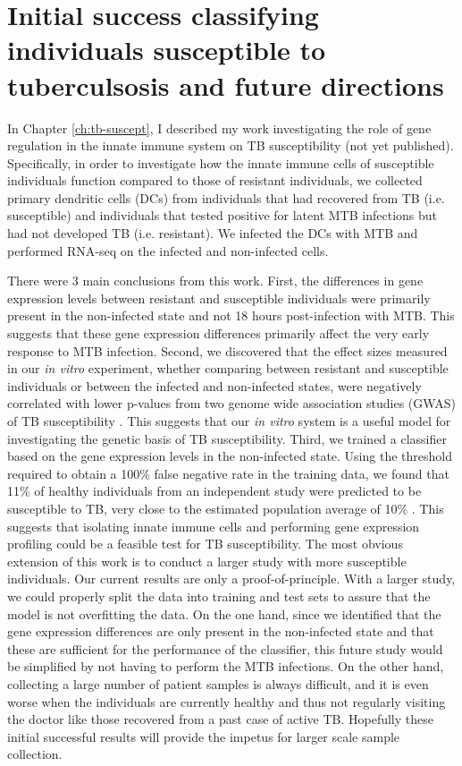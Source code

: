 \section{Initial success classifying individuals susceptible to tuberculsosis and future directions}

In Chapter \ref{ch:tb-suscept}, I described my work investigating the
role of gene regulation in the innate immune system on TB
susceptibility (not yet published). Specifically, in order to
investigate how the innate immune cells of susceptible individuals
function compared to those of resistant individuals, we collected
primary dendritic cells (DCs) from individuals that had recovered from
TB (i.e. susceptible) and individuals that tested positive for latent
MTB infections but had not developed TB (i.e. resistant). We infected
the DCs with MTB and performed RNA-seq on the infected and
non-infected cells.

There were 3 main conclusions from this work. First, the differences
in gene expression levels between resistant and susceptible
individuals were primarily present in the non-infected state and not 18
hours post-infection with MTB. This suggests that these gene
expression differences primarily affect the very early response to MTB
infection. Second, we discovered that the effect sizes measured in our
\emph{in vitro} experiment, whether comparing between resistant and
susceptible individuals or between the infected and non-infected
states, were negatively correlated with lower p-values from two genome
wide association studies (GWAS) of TB susceptibility \citep{Thye2010}. This suggests
that our \emph{in vitro} system is a useful model for investigating
the genetic basis of TB susceptibility. Third, we trained a classifier
based on the gene expression levels in the non-infected state. Using
the threshold required to obtain a 100\% false negative rate in the
training data, we found that 11\% of healthy individuals from an
independent study \citep{Barreiro2012} were predicted to be susceptible to TB, very close
to the estimated population average of 10\% \citep{North2004, OGarra2013}. This suggests that
isolating innate immune cells and performing gene expression profiling
could be a feasible test for TB susceptibility.  The most obvious
extension of this work is to conduct a larger study with more
susceptible individuals. Our current results are only a
proof-of-principle. With a larger study, we could properly split the
data into training and test sets to assure that the model is not
overfitting the data. On the one hand, since we identified that the
gene expression differences are only present in the non-infected state
and that these are sufficient for the performance of the classifier,
this future study would be simplified by not having to perform the MTB
infections. On the other hand, collecting a large number of patient
samples is always difficult, and it is even worse when the individuals
are currently healthy and thus not regularly visiting the doctor like
those recovered from a past case of active TB. Hopefully these initial
successful results will provide the impetus for larger scale sample
collection.

